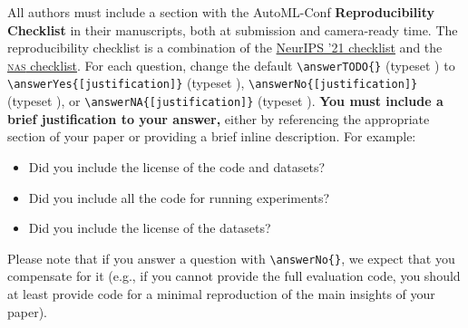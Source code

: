 \documentclass[11pt]{article}
\begin{document}
All authors must include a section with the AutoML-Conf \textbf{Reproducibility 
Checklist} in their manuscripts, both at submission and camera-ready time.
The reproducibility checklist is a combination of the
%
\href{https://neurips.cc/Conferences/2021/PaperInformation/PaperChecklist}
     {NeurIPS '21 checklist}
%
and the
\href{https://www.automl.org/wp-content/uploads/NAS/NAS_checklist.pdf}
     {\textsc{nas} checklist}.
%
For each question, change the default \verb|\answerTODO{}| (typeset \answerTODO)
to
\verb|\answerYes{[justification]}| (typeset \answerYes),
\verb|\answerNo{[justification]}| (typeset \answerNo), or
\verb|\answerNA{[justification]}| (typeset \answerNA).
\textbf{You must include a brief justification to your answer,} either by
referencing the appropriate section of your paper or providing a brief inline
description.  For example:
\begin{itemize}
\item Did you include the license of the code and datasets? 
\item Did you include all the code for running experiments? 
\item Did you include the license of the datasets? 
\end{itemize}
Please note that if you answer a question with \verb|\answerNo{}|, we expect
that you compensate for it (e.g., if you cannot provide the full evaluation
code, you should at least provide code for a minimal reproduction of the main
insights of your paper).
\end{document}
